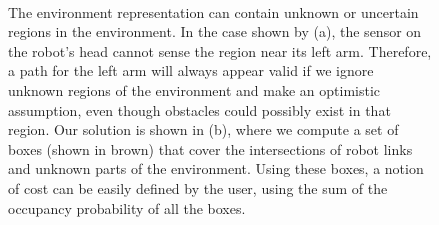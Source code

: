 \begin{figure}[!htbp]
\mbox{
\quad
{}
}
\caption[Comparison between the planning algorithms considering and not considering environment uncertainty]{\label{fig:8:unknowncollision} The environment representation can contain unknown
  or uncertain regions in the environment. In the case shown by (a),
  the sensor on the robot's head cannot sense the region near its left
  arm. Therefore, a path for the left arm will always appear
  valid if we ignore unknown regions of the environment and make an optimistic
  assumption, even though obstacles could possibly exist in that
  region. Our solution is shown in (b), where we compute a set of
  boxes (shown in brown) that cover the intersections of robot links
  and unknown parts of the environment. Using these boxes, a notion of
  cost can be easily defined by the user, using the sum of the occupancy probability of all the boxes. }
\end{figure}





